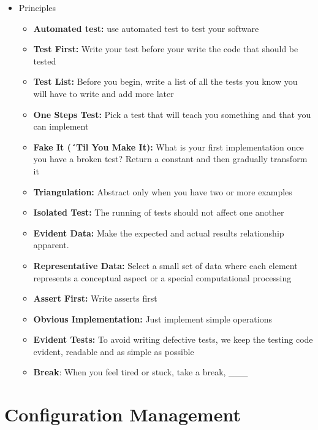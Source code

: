\documentclass[11pt]{article}
\providecommand{\tightlist}{%
      \setlength{\itemsep}{0pt}\setlength{\parskip}{0pt}}
\begin{document}
\begin{itemize}
\tightlist
\item
  Principles

  \begin{itemize}
  \tightlist
  \item
    \textbf{Automated test:} use automated test to test your software
  \item
    \textbf{Test First:} Write your test before your write the code that
    should be tested
  \item
    \textbf{Test List:} Before you begin, write a list of all the tests
    you know you will have to write and add more later
  \item
    \textbf{One Steps Test:} Pick a test that will teach you something
    and that you can implement
  \item
    \textbf{Fake It (´Til You Make It):} What is your first
    implementation once you have a broken test? Return a constant and
    then gradually transform it
  \item
    \textbf{Triangulation:} Abstract only when you have two or more
    examples
  \item
    \textbf{Isolated Test:} The running of tests should not affect one
    another
  \item
    \textbf{Evident Data:} Make the expected and actual results
    relationship apparent.
  \item
    \textbf{Representative Data:} Select a small set of data where each
    element represents a conceptual aspect or a special computational
    processing
  \item
    \textbf{Assert First:} Write asserts first
  \item
    \textbf{Obvious Implementation:} Just implement simple operations
  \item
    \textbf{Evident Tests:} To avoid writing defective tests, we keep
    the testing code evident, readable and as simple as possible
  \item
    \textbf{Break}: When you feel tired or stuck, take a break, \_\_\_
  \end{itemize}
\end{itemize}

    \hypertarget{configuration-management}{%
\section{Configuration Management}\label{configuration-management}}
\end{document}
